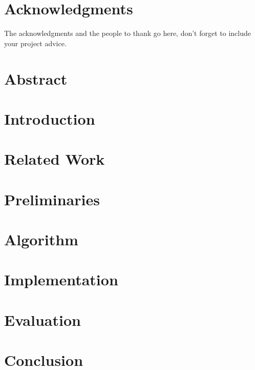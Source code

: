 \documentclass[a4paper,11pt,twoside,openright]{WCarticle}
\begin{document}

\tpage
\pagestyle{plain}

\chapter*{Acknowledgments}
The acknowledgments and the people to thank go here, don't forget to include your project advice. 


\chapter*{Abstract} 


\tableofcontents
\listoffigures
\listoftables

\cleardoublepage
\pagestyle{fancy}


\chapter{Introduction} \label{chap:intro}



\chapter{Related Work} \label{chap:backgrd}




\chapter{Preliminaries} \label{chap:prelim}



\chapter{Algorithm} \label{chap:alg}


\chapter{Implementation} \label{chap:impl}


\chapter{Evaluation} \label{chap:eval}


\chapter{Conclusion} \label{chap:conclusion}



\end{document}
